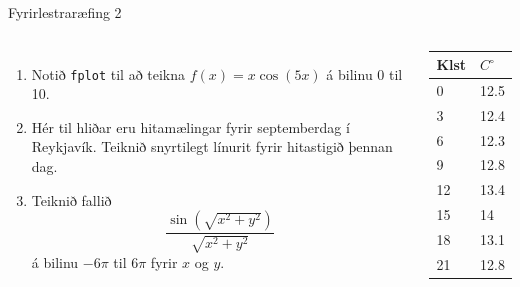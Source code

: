 \documentclass{beamer}
\begin{document}
\begin{frame}{Fyrirlestraræfing 2}
    \begin{columns}
        \begin{enumerate}
            \item Notið \texttt{fplot} til að teikna $f(x) = x\cos(5x)$ á bilinu 0 til 10.
            \item Hér til hliðar eru hitamælingar fyrir septemberdag í Reykjavík. Teiknið snyrtilegt línurit fyrir hitastigið þennan dag.
            \item Teiknið fallið
            \[
            \frac{\sin(\sqrt{x^2 + y^2})}{\sqrt{x^2 + y^2}}
            \]
            á bilinu $-6\pi$ til $6\pi$ fyrir $x$ og $y$.
        \end{enumerate}
        \begin{center}
        \begin{tabular}{ll}
        \toprule
        Klst&$C^\circ$\\
        \midrule
        0&12.5\\
        3&12.4\\
        6&12.3\\
        9&12.8\\
        12&13.4\\
        15&14\\
        18&13.1\\
        21&12.8\\
        \bottomrule
        \end{tabular}
        \end{center}
    \end{columns}
\end{frame}
\end{document}
